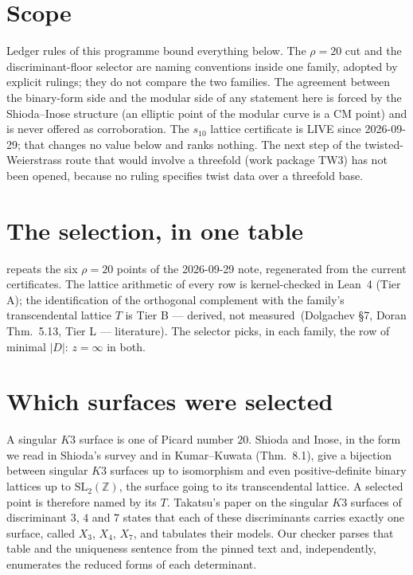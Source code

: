 \documentclass[11pt,a4paper]{article}
\theoremstyle{remark}
\newcommand{\tierA}{\colorbox{green!15}{\textsf{\scriptsize Tier A}}}
\newcommand{\tierB}{\colorbox{yellow!20}{\textsf{\scriptsize Tier B --- derived, not measured}}}
\newcommand{\tierL}{\colorbox{blue!10}{\textsf{\scriptsize Tier L --- literature}}}
\begin{document}
\section{Scope}\label{sec:scope}

Ledger rules of this programme bound everything below. The $\rho=20$ cut and the discriminant-floor
selector are naming conventions inside one family, adopted by explicit rulings; they do not compare the
two families. The agreement between the binary-form side and the modular side of any statement here is
forced by the Shioda--Inose structure (an elliptic point of the modular curve is a CM point) and is never
offered as corroboration. The $s_{10}$ lattice certificate is LIVE since 2026-09-29; that changes no value
below and ranks nothing. The next step of the twisted-Weierstrass route that would involve a threefold
(work package TW3) has not been opened, because no ruling specifies twist data over a threefold base.

\section{The selection, in one table}\label{sec:recap}

 repeats the six $\rho=20$ points of the 2026-09-29 note, regenerated from the current
certificates. The lattice arithmetic of every row is kernel-checked in Lean~4 (\tierA); the identification
of the orthogonal complement with the family's transcendental lattice $T$ is \tierB\ (Dolgachev \S7, Doran
Thm.~5.13, \tierL). The selector picks, in each family, the row of minimal $|D|$: $z=\infty$ in both.

\begin{table}[h]
\centering

\caption{The six $\rho=20$ points. Compared with the 2026-09-29 build, the $s_{10}$ rows no longer carry an
``(ADVISORY)'' tag; see \cref{sec:corrections}, item 1.}\label{tab:rows}
\end{table}

\section{Which surfaces were selected}\label{sec:identification}

A singular $K3$ surface is one of Picard number $20$. Shioda and Inose, in the form we read in Shioda's
survey and in Kumar--Kuwata (Thm.~8.1), give a bijection between singular $K3$ surfaces up to isomorphism
and even positive-definite binary lattices up to $\mathrm{SL}_2(\mathbb{Z})$, the surface going to its
transcendental lattice. A selected point is therefore named by its $T$. Takatsu's paper on the singular $K3$
surfaces of discriminant $3$, $4$ and $7$ states that each of these discriminants carries exactly one
surface, called $X_3$, $X_4$, $X_7$, and tabulates their models. Our checker parses that table and the
uniqueness sentence from the pinned text and, independently, enumerates the reduced forms of each
determinant.
\end{document}
